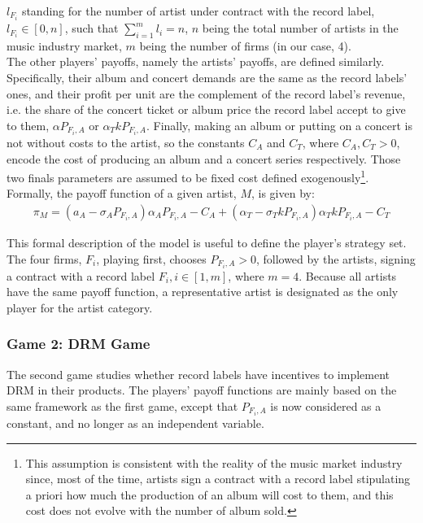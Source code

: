 \documentclass[a4paper,12pt]{article}
\numberwithin{equation}{section}
\begin{document}
$l_{F_i}$ standing for the number of artist under contract with the record label, $l_{F_i} \in [0, n]$, such that $\sum_{i = 1}^m l_i = n$, $n$ being the total number of artists in the music industry market, $m$ being the number of firms (in our case, 4).\\

The other players’ payoffs, namely the artists’ payoffs, are defined similarly. Specifically, their album and concert demands are the same as the record labels’ ones, and their profit per unit are the complement of the record label’s revenue, i.e. the share of the concert ticket or album price the record label accept to give to them, $\alpha P_{F_i, A}$ or $\alpha_T k P_{F_i, A}$. Finally, making an album or putting on a concert is not without costs to the artist, so the constants $C_A$ and $C_T$, where $C_A, C_T > 0$,  encode the cost of producing an album and a concert series respectively. Those two finals parameters are assumed to be fixed cost defined exogenously\footnote{
This assumption is consistent with the reality of the music market industry since, most of the time, artists sign a contract with a record label stipulating a priori how much the production of an album will cost to them, and this cost does not evolve with the number of album sold.
}. Formally, the payoff function of a given artist, $M$, is given by:
\begin{eqnarray}
\pi_M = (a_A - \sigma_A P_{F_i, A})\alpha_A P_{F_i, A} - C_A
	+ (\alpha_T - \sigma_T k P_{F_i, A}) \alpha_T k P_{F_i, A} - C_T
\end{eqnarray}

This formal description of the model is useful to define the player’s strategy set. The four firms, $F_i$, playing first, chooses $P_{F_i, A} > 0$, followed by the artists, signing a contract with a record label $F_i, i \in [1, m]$, where $m = 4$. Because all artists have the same payoff function, a representative artist is designated as the only player for the artist category. 

\subsubsection{Game 2: DRM Game}

The second game studies whether record labels have incentives to implement DRM in their products. The players’ payoff functions are mainly based on the same framework as the first game, except that $P_{F_i, A}$ is now considered as a constant, and no longer as an independent variable.\\
\end{document}

